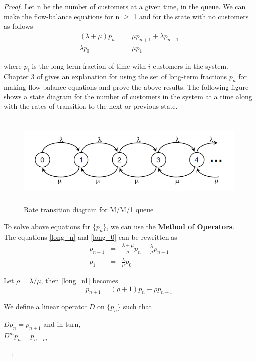 \begin{proof}
Let n be the number of customers at a given time, in the queue. We can make the flow-balance equations for n $\ge$ 1 and for the state with no customers as follows
\begin{eqnarray}
(\lambda + \mu)p_n &=& \mu p_{n+1} + \lambda p_{n-1} \label{long_n} \\
\lambda p_0 &=& \mu p_1  \label{long_0}
\end{eqnarray}

where $p_i$ is the long-term fraction of time with $i$ customers in the system. Chapter 3 of \cite{gross} gives an explanation for using the set of long-term fractions ${p_n}$ for making flow balance equations and prove the above results. The following figure shows a state diagram for the number of customers in the system at a time along with the rates of transition to the next or previous state.

\begin{figure}[h]
\includegraphics[height=4.5cm]{Rate_transition_diagram.png}
\caption{Rate transition diagram for M/M/1 queue}
\end{figure}

To solve above equations for $\{ p_n \}$, we can use the \textbf{Method of Operators}.
\\ The equations \ref{long_n} and \ref{long_0} can be rewritten as
\begin{eqnarray}
 p_{n+1} &=& \frac{\lambda + \mu}{\mu}p_n  - \frac{\lambda}{\mu} p_{n-1} \label{long_n1} \\
 p_1 &=& \frac{\lambda}{\mu}p_0 \label{long_01}
\end{eqnarray}

Let $\rho = \lambda / \mu$, then \ref{long_n1} becomes
\begin{equation}
    p_{n+1} = (\rho + 1) p_n - \rho p_{n-1} \label{long_n2}
\end{equation}

We define a linear operator $D$ on $\{ p_n \}$ such that
\begin{center}
    $D p_n = p_{n+1}$ \hspace{3mm} and in turn, \\
    $D^m p_n = p_{n+m}$
\end{center}


\end{proof}
